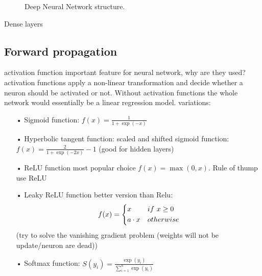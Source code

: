 \begin{center}
\begin{figure}[th]
        \caption{Deep Neural Network structure.}
        \label{fig:DNN}
    \end{figure}
\end{center}

Dense layers

\subsection{Forward propagation}
activation function important feature for neural network, why are they used?
activation functions apply a non-linear transformation and decide whether a neuron should be activated or not. Without activation functions the whole network would essentially be a linear regression model.
variations:
\begin{enumerate}
\item[•] Sigmoid function: $f(x)=\frac{1}{1+\exp(-x)}$
\item[•] Hyperbolic tangent function: scaled and shifted sigmoid function: $f(x)=\frac{2}{1+\exp(-2x)} - 1$ (good for hidden layers)
\item[•] ReLU function most popular choice $f(x)=\max(0,x)$. Rule of thump use ReLU
\item[•] Leaky ReLU function better version than Relu:  \[ f(x)=
    \begin{dcases}
        x & if \ x \geq 0 \\
        a\cdot x & otherwise \\
    \end{dcases}
\] (try to solve the vanishing gradient problem (weights will not be update/neuron are dead))
\item[•] Softmax function: $S(y_i)=\frac{\exp(y_i)}{\sum_{i=1}^{n}\exp(y_i)}$
\end{enumerate}

